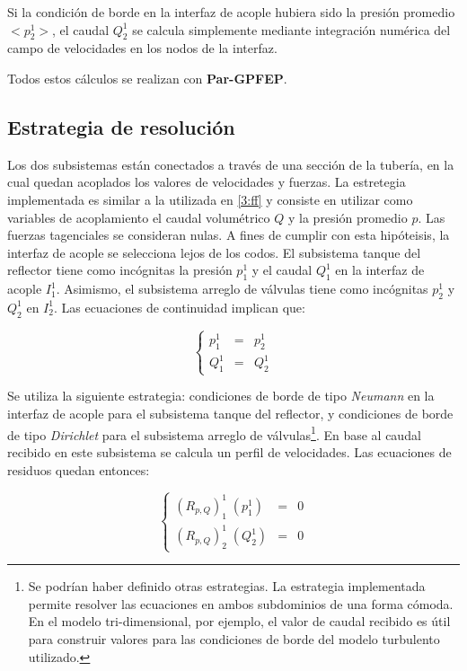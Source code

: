 Si la condición de borde en la interfaz de acople hubiera sido la presión promedio $<p_2^1>$,
el caudal $Q_2^1$ se calcula simplemente mediante integración numérica del campo de velocidades en los nodos de la interfaz.

Todos estos cálculos se realizan con \textbf{Par-GPFEP}.

\subsection{Estrategia de resolución}

Los dos subsistemas están conectados a través de una sección de la tubería,
en la cual quedan acoplados los valores de velocidades y fuerzas.
La estretegia implementada es similar a la utilizada en \ref{3:ff} y consiste en utilizar como variables de acoplamiento el caudal volumétrico $Q$ y la presión promedio $p$.
Las fuerzas tagenciales se consideran nulas.
A fines de cumplir con esta hipóteisis, la interfaz de acople se selecciona lejos de los codos.
El subsistema tanque del reflector tiene como incógnitas la presión $p_1^1$ y el caudal $Q_1^1$ en la interfaz de acople $I_1^1$.
Asimismo, el subsistema arreglo de válvulas tiene como incógnitas $p_2^1$ y $Q_2^1$ en $I_2^1$.
Las ecuaciones de continuidad implican que:

\begin{equation}
\left\{ \begin{array}{rcl}
p_1^1 &=& p_2^1 \\
Q_1^1 &=& Q_2^1
\end{array}
\right.
\end{equation}

Se utiliza la siguiente estrategia:
condiciones de borde de tipo \textit{Neumann} en la interfaz de acople para el subsistema tanque del reflector,
y condiciones de borde de tipo \textit{Dirichlet} para el subsistema arreglo de válvulas\footnote{
Se podrían haber definido otras estrategias.
La estrategia implementada permite resolver las ecuaciones en ambos subdominios de una forma cómoda.
En el modelo tri-dimensional, por ejemplo, el valor de caudal recibido es útil para construir valores para las condiciones de borde del modelo turbulento utilizado.
}.
En base al caudal recibido en este subsistema se calcula un perfil de velocidades.
Las ecuaciones de residuos quedan entonces:

\begin{equation}
\left\{ \begin{array}{rcl}
(R_{p,Q})_{1}^{1}  \;(p_1^1) &=& 0 \\
(R_{p,Q})_{2}^{1}  \;(Q_2^1) &=& 0
\end{array}
\right.
\end{equation}


